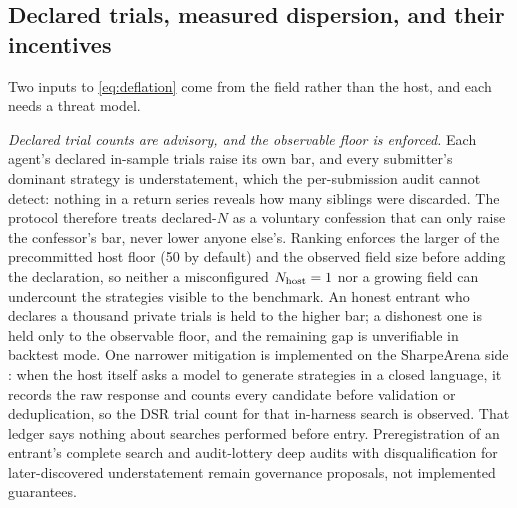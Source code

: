 \subsection{Declared trials, measured dispersion, and their incentives}\label{sec:incentives}

Two inputs to \cref{eq:deflation} come from the field rather than the host, and each needs a threat model.

\emph{Declared trial counts are advisory, and the observable floor is enforced.} Each agent's declared in-sample trials raise its own bar, and every submitter's dominant strategy is understatement, which the per-submission audit cannot detect: nothing in a return series reveals how many siblings were discarded. The protocol therefore treats declared-$N$ as a voluntary confession that can only raise the confessor's bar, never lower anyone else's. Ranking enforces the larger of the precommitted host floor (50 by default) and the observed field size before adding the declaration, so neither a misconfigured $N_{\rm host}=1$ nor a growing field can undercount the strategies visible to the benchmark. An honest entrant who declares a thousand private trials is held to the higher bar; a dishonest one is held only to the observable floor, and the remaining gap is unverifiable in backtest mode. One narrower mitigation is implemented on the SharpeArena side \citep{toca2026sharpearena}: when the host itself asks a model to generate strategies in a closed language, it records the raw response and counts every candidate before validation or deduplication, so the DSR trial count for that in-harness search is observed. That ledger says nothing about searches performed before entry. Preregistration of an entrant's complete search and audit-lottery deep audits with disqualification for later-discovered understatement remain governance proposals, not implemented guarantees.

